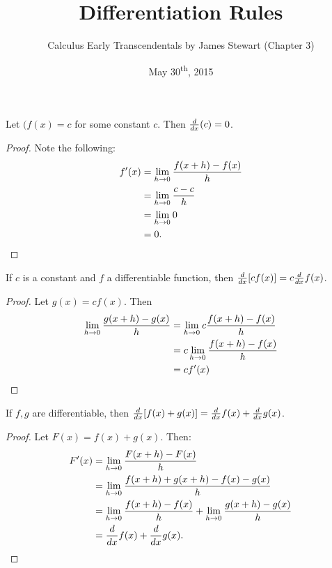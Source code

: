 \documentclass[a4paper,11pt]{article}
\title{Differentiation Rules}
\author{Calculus Early Transcendentals by James Stewart (Chapter 3)}
\date{May 30\textsuperscript{th}, 2015}
\begin{document}
\maketitle
{}

\begin{outline}

    Let \((f(x)=c\) for some constant \(c\). Then \(\frac{d}{dx}(c) = 0\).
    
    \begin{proof}
      Note the following:
      \begin{align*}
        f'(x) &= \lim\limits_{h\rightarrow 0^{}}\frac{f(x+h)-f(x)}{h}\\
              &= \lim\limits_{h\rightarrow 0^{}}\frac{c-c}{h}        \\
              &= \lim\limits_{h\rightarrow 0^{}}0                    \\
              &= 0\text{.}
      \end{align*}
    \end{proof}
    
    If \(c\) is a constant and \(f\) a differentiable function, then \(\frac{d}{dx}[cf(x)] = c\frac{d}{dx}f(x)\).
    
    \begin{proof}
      Let \(g(x) = cf(x)\). Then 
      \begin{align*}
        \lim\limits_{h\rightarrow 0^{}} \frac{g(x+h)-g(x)}{h} &= \lim\limits_{h\rightarrow 0^{}} c\frac{f(x+h)-f(x)}{h}\\
                                            &= c \lim\limits_{h\rightarrow 0^{}}\frac{f(x+h)-f(x)}{h}\\
                                            &= cf'(x)
      \end{align*}
    \end{proof}
    
    If \(f, g\) are differentiable, then \(\frac{d}{dx}[f(x)+g(x)] = \frac{d}{dx}f(x) + \frac{d}{dx}g(x)\).
    
    \begin{proof}
      Let \(F(x) = f(x) + g(x)\). Then:
      \begin{align*}
        F'(x) &= \lim\limits_{h\rightarrow 0^{}}\frac{F(x+h)-F(x)}{h}\\
              &= \lim\limits_{h\rightarrow 0^{}}\frac{f(x+h)+g(x+h)-f(x)-g(x)}{h}\\
              &= \lim\limits_{h\rightarrow 0^{}}\frac{f(x+h)-f(x)}{h} + \lim\limits_{h\rightarrow 0^{}}\frac{g(x+h)-g(x)}{h}\\
              &= \frac{d}{dx}f(x) + \frac{d}{dx}g(x)\text{.}
      \end{align*}
    \end{proof}
    

\end{outline}
\end{document}
